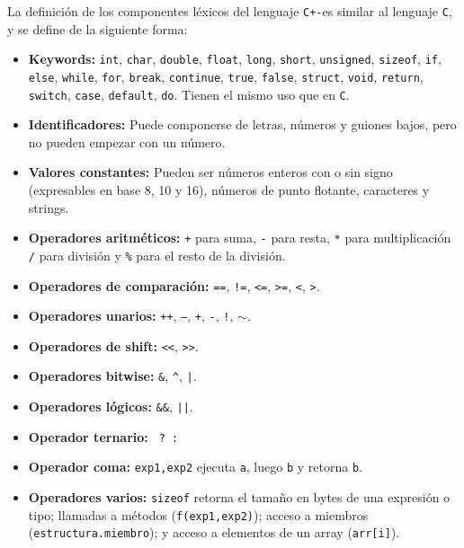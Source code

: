 \documentclass[12pt]{article}
\newcommand{\Cp}{\texttt{C+-}}
\newcommand{\C}{\texttt{C}}
\begin{document}
La definici\'on de los componentes l\'exicos del lenguaje \Cp es similar al lenguaje \C, y se define de la siguiente forma:
\begin{itemize}
    \item \textbf{Keywords:} \texttt{int}, \texttt{char}, \texttt{double}, \texttt{float}, \texttt{long}, \texttt{short}, \texttt{unsigned}, \texttt{sizeof}, \texttt{if}, \texttt{else}, \texttt{while}, \texttt{for}, \texttt{break}, \texttt{continue}, \texttt{true}, \texttt{false}, \texttt{struct}, \texttt{void}, \texttt{return}, \texttt{switch}, \texttt{case}, \texttt{default}, \texttt{do}. Tienen el mismo uso que en \C.
    \item \textbf{Identificadores:} Puede componerse de letras, n\'umeros y guiones bajos, pero no pueden empezar con un n\'umero.
    \item \textbf{Valores constantes:} Pueden ser n\'umeros enteros con o sin signo (expresables en base 8, 10 y 16), n\'umeros de punto flotante, caracteres y strings.
    \item \textbf{Operadores aritm\'eticos:} \texttt{+} para suma, \texttt{-} para resta, \texttt{*} para multiplicaci\'on \texttt{/} para divisi\'on y \texttt{\%} para el resto de la divisi\'on.
    \item \textbf{Operadores de comparaci\'on:} \texttt{==}, \texttt{!=}, \texttt{<=}, \texttt{>=}, \texttt{<}, \texttt{>}.
    \item \textbf{Operadores unarios:} \texttt{++}, \texttt{--}, \texttt{+}, \texttt{-}, \texttt{!}, $\mathtt\sim$.
    \item \textbf{Operadores de shift:} \texttt{<<}, \texttt{>>}.
    \item \textbf{Operadores bitwise:} \texttt{\&}, \texttt{\^}, \texttt{|}.
    \item \textbf{Operadores l\'ogicos:} \texttt{\&\&}, \texttt{||}.
    \item \textbf{Operador ternario:} \texttt{ ? : }
    \item \textbf{Operador coma:} \texttt{exp1,exp2} ejecuta \texttt{a}, luego \texttt{b} y retorna \texttt{b}.
    \item \textbf{Operadores varios:} \texttt{sizeof} retorna el tama\~no en bytes de una expresi\'on o tipo; llamadas a m\'etodos (\texttt{f(exp1,exp2)}); acceso a miembros (\texttt{estructura.miembro}); y acceso a elementos de un array (\texttt{arr[i]}).
\end{itemize}
\end{document}
